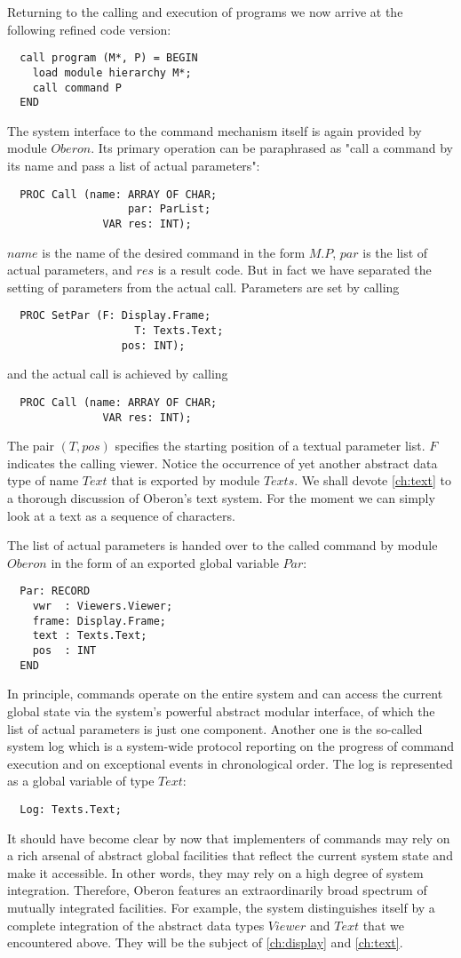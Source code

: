 Returning to the calling and execution of programs we now arrive at the following refined code version:
\begin{verbatim}
  call program (M*, P) = BEGIN
    load module hierarchy M*;
    call command P
  END
\end{verbatim}
The system interface to the command mechanism itself is again provided by module $Oberon$. Its
primary operation can be paraphrased as "call a command by its name and pass a list of actual parameters":
\begin{verbatim}
  PROC Call (name: ARRAY OF CHAR;
                   par: ParList;
               VAR res: INT);
\end{verbatim}
$name$ is the name of the desired command in the form $M.P$, $par$ is the list of actual parameters,
and $res$ is a result code. But in fact we have separated the setting of parameters from the actual
call. Parameters are set by calling
\begin{verbatim}
  PROC SetPar (F: Display.Frame;
                    T: Texts.Text;
                  pos: INT);
\end{verbatim}
and the actual call is achieved by calling
\begin{verbatim}
  PROC Call (name: ARRAY OF CHAR;
               VAR res: INT);
\end{verbatim}
The pair $(T, pos)$ specifies the starting position of a textual parameter list. $F$ indicates the 
calling viewer. Notice the occurrence of yet another abstract data type of name $Text$ that is exported 
by module $Texts$. We shall devote \ref{ch:text} to a thorough discussion of Oberon's text 
system. For the moment we can simply look at a text as a sequence of characters.

The list of actual parameters is handed over to the called command by module $Oberon$ in the form
of an exported global variable $Par$:
\begin{verbatim}
  Par: RECORD
    vwr  : Viewers.Viewer;
    frame: Display.Frame;
    text : Texts.Text;
    pos  : INT
  END
\end{verbatim}
In principle, commands operate on the entire system and can access the current global state via
the system's powerful abstract modular interface, of which the list of actual parameters is just one
component. Another one is the so-called system log which is a system-wide protocol reporting on
the progress of command execution and on exceptional events in chronological order. The log is
represented as a global variable of type $Text$:
\begin{verbatim}
  Log: Texts.Text;
\end{verbatim}
It should have become clear by now that implementers of commands may rely on a rich arsenal of
abstract global facilities that reflect the current system state and make it accessible. In other
words, they may rely on a high degree of system integration. Therefore, Oberon features an
extraordinarily broad spectrum of mutually integrated facilities. For example, the system
distinguishes itself by a complete integration of the abstract data types $Viewer$ and $Text$ that we
encountered above. They will be the subject of \ref{ch:display} and \ref{ch:text}.

